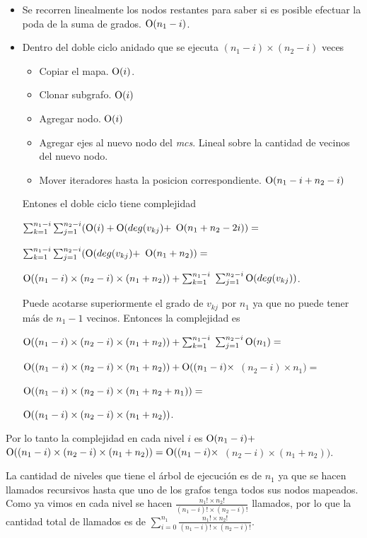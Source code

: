 \begin{itemize}
\item Se recorren linealmente los nodos restantes para saber si es posible
efectuar la poda de la suma de grados. $\operatorname{O}(n_1 - i)$.
\item Dentro del doble ciclo anidado que se ejecuta
$(n_1 - i) \times (n_2 - i)$ veces
\begin{itemize}
\item Copiar el mapa. $\operatorname{O}(i)$.
\item Clonar subgrafo. $\operatorname{O}(i)$
\item Agregar nodo. $\operatorname{O}(i)$
\item Agregar ejes al nuevo nodo del \textit{mcs}. Lineal sobre la cantidad de
vecinos del nuevo nodo.
\item Mover iteradores hasta la posicion correspondiente.
$\operatorname{O}(n_1 - i + n_2 - i)$
\end{itemize}
Entones el doble ciclo tiene complejidad

$\sum_{k = 1}^{n_1 - i} \sum_{j = 1}^{n_2 - i} (\operatorname{O}(i) + \operatorname{O}(deg(v_{kj}) +$
$ \operatorname{O}(n_1 + n_2 - 2i))=$

$\sum_{k = 1}^{n_1 - i} \sum_{j = 1}^{n_2 - i} (\operatorname{O}(deg(v_{kj}) +$
$ \operatorname{O}(n_1 + n_2))=$

$\operatorname{O}((n_1 - i) \times (n_2 - i) \times (n_1 + n_2)) + \sum_{k = 1}^{n_1 - i}$
$ \sum_{j = 1}^{n_2 - i} \operatorname{O}(deg(v_{kj}))$.

Puede acotarse superiormente el grado de $v_{kj}$ por $n_1$ ya que no puede
tener más de $n_1 - 1$ vecinos. Entonces la complejidad es

$\operatorname{O}((n_1 - i) \times (n_2 - i) \times (n_1 + n_2)) + \sum_{k = 1}^{n_1 - i}$
$\sum_{j = 1}^{n_2 - i} \operatorname{O}(n_1)=$

$\operatorname{O}((n_1 - i) \times (n_2 - i) \times (n_1 + n_2)) + \operatorname{O}((n_1 - i) \times$
$(n_2 - i) \times n_1)=$

$\operatorname{O}((n_1 - i) \times (n_2 - i) \times (n_1 + n_2 + n_1))=$

$\operatorname{O}((n_1 - i) \times (n_2 - i) \times (n_1 + n_2))$.
\end{itemize}

Por lo tanto la complejidad en cada nivel $i$ es $\operatorname{O}(n_1 - i) +$
$\operatorname{O}((n_1 - i) \times (n_2 - i) \times (n_1 + n_2)) = \operatorname{O}((n_1 - i) \times$
$ (n_2 - i) \times (n_1 + n_2))$.

La cantidad de niveles que tiene el árbol de ejecución es de $n_1$ ya que se
hacen llamados recursivos hasta que uno de los grafos tenga todos sus nodos
mapeados. Como ya vimos en cada nivel se hacen
$\frac{n_1! \times n_2!}{(n_1 - i)! \times (n_2 - i)!}$ llamados, por lo que
la cantidad total de llamados es de
$\sum_{i = 0}^{n_1} \frac{n_1! \times n_2!}{(n_1 - i)! \times (n_2 - i)!}$.

